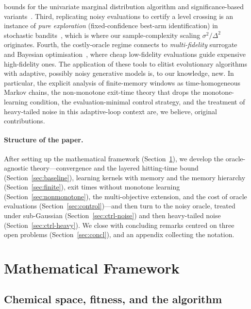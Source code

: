 \documentclass[11pt,a4paper]{article}
\begin{document}
bounds for the univariate marginal distribution algorithm and
significance-based variants~\cite{DoerrKrejca2018}.  Third, replicating noisy
evaluations to certify a level crossing is an instance of \emph{pure
exploration} (fixed-confidence best-arm identification) in stochastic
bandits~\cite{EvenDar2006,Audibert2010,Kaufmann2016}, which is where our
sample-complexity scaling $\sigma^2/\Delta^2$ originates.  Fourth, the
costly-oracle regime connects to \emph{multi-fidelity} surrogate and Bayesian
optimisation~\cite{Forrester2007,Kandasamy2017}, where cheap low-fidelity
evaluations guide expensive high-fidelity ones.  The application of these tools to
elitist evolutionary algorithms with adaptive, possibly noisy generative
models is, to our knowledge, new.  In particular, the explicit analysis of
finite-memory windows as time-homogeneous Markov chains, the
non-monotone exit-time theory that drops the monotone-learning condition,
the evaluation-minimal control strategy, and the treatment of heavy-tailed
noise in this adaptive-loop context are, we believe, original contributions.

\paragraph{Structure of the paper.}
After setting up the mathematical framework (Section~\ref{sec:framework}),
we develop the oracle-agnostic theory---convergence and the layered
hitting-time bound (Section~\ref{sec:baseline}), learning kernels with
memory and the memory hierarchy (Section~\ref{sec:finite}), exit times
without monotone learning (Section~\ref{sec:nonmonotone}), the
multi-objective extension, and the cost of oracle evaluations
(Section~\ref{sec:control})---and then turn to the noisy oracle, treated
under sub-Gaussian (Section~\ref{sec:ctrl-noise}) and then heavy-tailed
noise (Section~\ref{sec:ctrl-heavy}).  We close with concluding remarks
centred on three open problems (Section~\ref{sec:concl}), and an appendix
collecting the notation.

\section{Mathematical Framework}
\label{sec:framework}

\subsection{Chemical space, fitness, and the algorithm}
\end{document}
